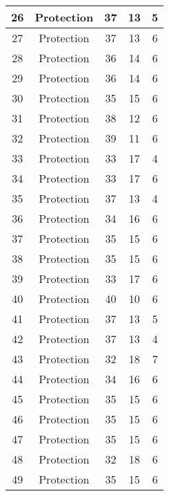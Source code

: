 \documentclass[results.tex]{subfiles}
\begin{document}
\begin{center}
\begin{tabular}{| c || c | c | c | c |}
    \hline
    26 & Protection & 37 & 13 & 5 \\ 
    \hline
    27 & Protection & 37 & 13 & 6 \\ 
    \hline
    28 & Protection & 36 & 14 & 6 \\ 
    \hline
    29 & Protection & 36 & 14 & 6 \\ 
    \hline
    30 & Protection & 35 & 15 & 6 \\ 
    \hline
    31 & Protection & 38 & 12 & 6 \\ 
    \hline
    32 & Protection & 39 & 11 & 6 \\ 
    \hline
    33 & Protection & 33 & 17 & 4 \\ 
    \hline
    34 & Protection & 33 & 17 & 6 \\ 
    \hline
    35 & Protection & 37 & 13 & 4 \\ 
    \hline
    36 & Protection & 34 & 16 & 6 \\ 
    \hline
    37 & Protection & 35 & 15 & 6 \\ 
    \hline
    38 & Protection & 35 & 15 & 6 \\ 
    \hline
    39 & Protection & 33 & 17 & 6 \\ 
    \hline
    40 & Protection & 40 & 10 & 6 \\ 
    \hline
    41 & Protection & 37 & 13 & 5 \\ 
    \hline
    42 & Protection & 37 & 13 & 4 \\ 
    \hline
    43 & Protection & 32 & 18 & 7 \\ 
    \hline
    44 & Protection & 34 & 16 & 6 \\ 
    \hline
    45 & Protection & 35 & 15 & 6 \\ 
    \hline
    46 & Protection & 35 & 15 & 6 \\ 
    \hline
    47 & Protection & 35 & 15 & 6 \\ 
    \hline
    48 & Protection & 32 & 18 & 6 \\ 
    \hline
    49 & Protection & 35 & 15 & 6 \\ 
    \hline   \end{tabular}
\end{center}
\end{document}
